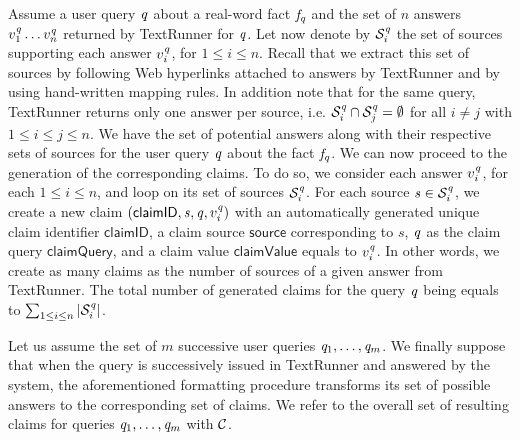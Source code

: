 Assume a user query $\mathit{q}$ about a real-word fact $\mathit{f}_{\mathit{q}}$ and the set of $n$ answers $v_1^{\mathit{q}}\ldots v_n^{\mathit{q}}$
returned by TextRunner for $\mathit{q}$. Let now denote by $\mathcal{S}_{i}^{\mathit{q}}$ the set of sources supporting each answer $v_i^{\mathit{q}}$,
for $1\leq i\leq n$. Recall that we extract this set of sources by following Web hyperlinks attached to answers by TextRunner and by 
using hand-written mapping rules. In addition note that for the same query, TextRunner returns only one answer per source, i.e. $\mathcal{S}_{i}^{\mathit{q}}
\cap \mathcal{S}_{j}^{\mathit{q}}=\emptyset$ for all $i\neq j$ with $1\leq i\leq j\leq n$. We have the set of potential answers along with their
respective sets of sources for the user query $\mathit{q}$ about the fact $\mathit{f}_{\mathit{q}}$. We can now proceed to the generation of the corresponding claims.
To do so, we consider each answer $v_i^{\mathit{q}}$, for each $1\leq i\leq n$, and loop on its set of sources $\mathcal{S}_{i}^{\mathit{q}}$. For each source 
$\mathit{s}_{} \in \mathcal{S}_{i}^{\mathit{q}}$, we create a new claim $(\textsf{claimID}, \mathit{s}_{}, \mathit{q}, v_i^{\mathit{q}})$ with an automatically generated unique claim 
identifier $\textsf{claimID}$, a claim source $\textsf{source}$ corresponding to $s$,  $\mathit{q}$ as the claim query $\textsf{claimQuery}$, and a claim value $\textsf{claimValue}$ equals 
to  $v_i^{\mathit{q}}$. In other words, we create as many claims as the number of sources of a given answer from TextRunner. The total number of generated claims for the query $\mathit{q}$ being 
equals to $\sum_{1\leq i\leq n} | \mathcal{S}_{i}^{\mathit{q}} |$.


Let us assume the set of $m$ successive user queries $\mathit{q}_1,\ldots, \mathit{q}_m$. We finally suppose that when the 
query is successively issued in TextRunner and answered by the system, the aforementioned formatting procedure transforms its set
of possible answers to the corresponding set of claims. We refer to the overall set of resulting claims for queries $\mathit{q}_1,\ldots, \mathit{q}_m$
with $\mathcal{C}$.
 



